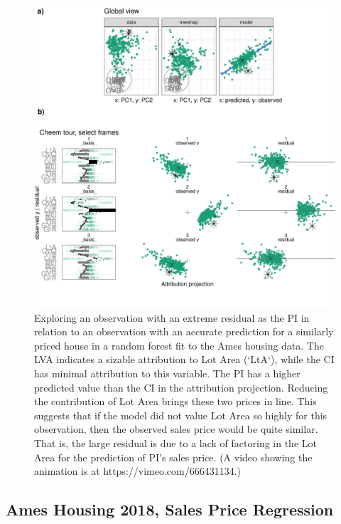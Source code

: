 \documentclass[
]{sn-jnl}
\begin{document}
\begin{CodeChunk}
\begin{figure}

{\centering \includegraphics[width=0.9\linewidth]{./figures/case_ames2018} 

}

\caption[Exploring an observation with an extreme residual as the PI in relation to an observation with an accurate prediction for a similarly priced house in a random forest fit to the Ames housing data]{Exploring an observation with an extreme residual as the PI in relation to an observation with an accurate prediction for a similarly priced house in a random forest fit to the Ames housing data. The LVA indicates a sizable attribution to Lot Area (`LtA`), while the CI has minimal attribution to this variable. The PI has a higher predicted value than the CI in the attribution projection. Reducing the contribution of Lot Area brings these two prices in line. This suggests that if the model did not value Lot Area so highly for this observation, then the observed sales price would be quite similar. That is, the large residual is due to a lack of factoring in the Lot Area for the prediction of PI's sales price. (A video showing the animation is at https://vimeo.com/666431134.)}\label{fig:caseames}
\end{figure}
\end{CodeChunk}

\hypertarget{ames-housing-2018-sales-price-regression}{%
\subsection{Ames Housing 2018, Sales Price
Regression}\label{ames-housing-2018-sales-price-regression}}
\end{document}
